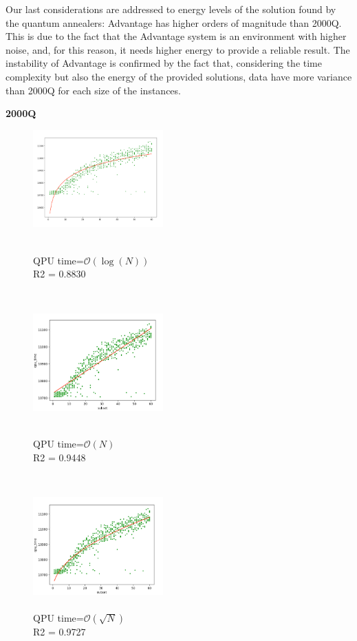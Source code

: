 \documentclass[oneside,a4paper]{article}
\begin{document}
Our last considerations are addressed to energy levels of the solution found by the quantum annealers: Advantage has higher orders of magnitude than 2000Q. This is due to the fact that the Advantage system is an environment with higher noise, and, for this reason, it needs higher energy to provide a reliable result. The instability of Advantage is confirmed by the fact that, considering the time complexity but also the energy of the provided solutions, data have more variance than 2000Q for each size of the instances.


\textbf{2000Q}

\begin{figure}[htp]
\begin{minipage}[b]{5cm}
\includegraphics[width=5cm]{LaTeXTemplate/Images/2000QpossibleFitting1.png}
\caption{\\QPU time=$\mathcal{O}(\log(N))$\\
R2 = 0.8830\\
}
\end{minipage}
\ \hspace{2mm} \hspace{2mm} \
\begin{minipage}[b]{5cm}
\includegraphics[width=5cm]{LaTeXTemplate/Images/2000QpossibleFitting2.png}
\caption{\\QPU time=$\mathcal{O}(N)$\\
R2 = 0.9448\\}
\end{minipage}
\ \hspace{2mm} \hspace{2mm} \
\begin{minipage}[b]{5cm}
\centering
\includegraphics[width=5cm]{LaTeXTemplate/Images/2000QpossibleFitting3.png}
\caption{\\QPU time=$\mathcal{O}(\sqrt{N})$\\
{\color{ForestGreen}R2 = 0.9727\\}}
\end{minipage}
\end{figure}
\end{document}

